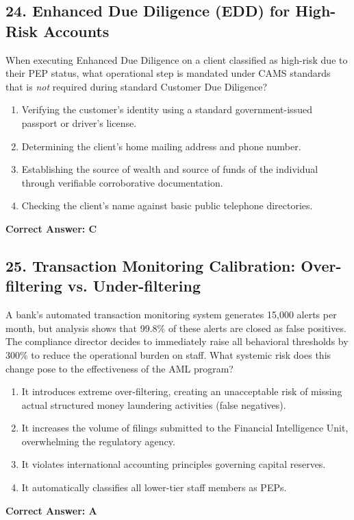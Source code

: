 \documentclass[11pt,a4paper]{article}
\begin{document}
	\subsection{24. Enhanced Due Diligence (EDD) for High-Risk Accounts}
	When executing Enhanced Due Diligence on a client classified as high-risk due to their PEP status, what operational step is mandated under CAMS standards that is \textit{not} required during standard Customer Due Diligence?
	\begin{enumerate}[label=\Alph*.]
		\item Verifying the customer's identity using a standard government-issued passport or driver's license.
		\item Determining the client's home mailing address and phone number.
		\item Establishing the source of wealth and source of funds of the individual through verifiable corroborative documentation.
		\item Checking the client's name against basic public telephone directories.
	\end{enumerate}
	\textbf{Correct Answer: C}
	
	\subsection{25. Transaction Monitoring Calibration: Over-filtering vs. Under-filtering}
	A bank's automated transaction monitoring system generates 15,000 alerts per month, but analysis shows that 99.8\% of these alerts are closed as false positives. The compliance director decides to immediately raise all behavioral thresholds by 300\% to reduce the operational burden on staff. What systemic risk does this change pose to the effectiveness of the AML program?
	\begin{enumerate}[label=\Alph*.]
		\item It introduces extreme over-filtering, creating an unacceptable risk of missing actual structured money laundering activities (false negatives).
		\item It increases the volume of filings submitted to the Financial Intelligence Unit, overwhelming the regulatory agency.
		\item It violates international accounting principles governing capital reserves.
		\item It automatically classifies all lower-tier staff members as PEPs.
	\end{enumerate}
	\textbf{Correct Answer: A}
	
\end{document}
